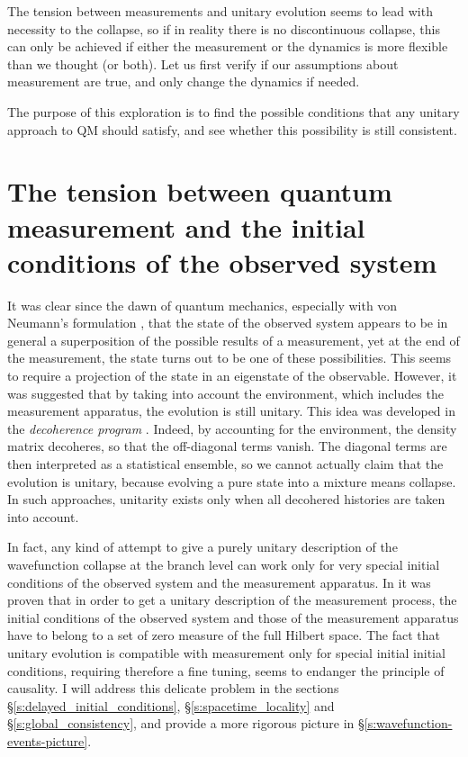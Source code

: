 \documentclass[12pt]{amsart}
\theoremstyle{definition}
\theoremstyle{plain}
\begin{document}
The tension between measurements and unitary evolution seems to lead with necessity to the collapse, so if in reality there is no discontinuous collapse, this can only be achieved if either the measurement or the dynamics is more flexible than we thought (or both). Let us first verify if our assumptions about measurement are true, and only change the dynamics if needed.

The purpose of this exploration is to find the possible conditions that any unitary approach to QM should satisfy, and see whether this possibility is still consistent.


\section{The tension between quantum measurement and the initial conditions of the observed system}
\label{s:qm_init_cond}

It was clear since the dawn of quantum mechanics, especially with von Neumann's formulation \cite{vonNeumann1955foundations}, that the state of the observed system appears to be in general a superposition of the possible results of a measurement, yet at the end of the measurement, the state turns out to be one of these possibilities. This seems to require a projection of the state in an eigenstate of the observable. However, it was suggested that by taking into account the environment, which includes the measurement apparatus, the evolution is still unitary. This idea was developed in the \textit{decoherence program} \cite{Zeh96,Zur98,Zur03a}. Indeed, by accounting for the environment, the density matrix decoheres, so that the off-diagonal terms vanish. The diagonal terms are then interpreted as a statistical ensemble, so we cannot actually claim that the evolution is unitary, because evolving a pure state into a mixture means collapse. In such approaches, unitarity exists only when all decohered histories are taken into account.

In fact, any kind of attempt to give a purely unitary description of the wavefunction collapse at the branch level can work only for very special initial conditions of the observed system and the measurement apparatus. In \cite{Sto12QMb} it was proven that in order to get a unitary description of the measurement process, the initial conditions of the observed system and those of the measurement apparatus have to belong to a set of zero measure of the full Hilbert space. The fact that unitary evolution is compatible with measurement only for special initial initial conditions, requiring therefore a fine tuning, seems to endanger the principle of causality. I will address this delicate problem in  the sections \S\ref{s:delayed_initial_conditions}, \S\ref{s:spacetime_locality} and \S\ref{s:global_consistency}, and provide a more rigorous picture in \S\ref{s:wavefunction-events-picture}.
\end{document}
